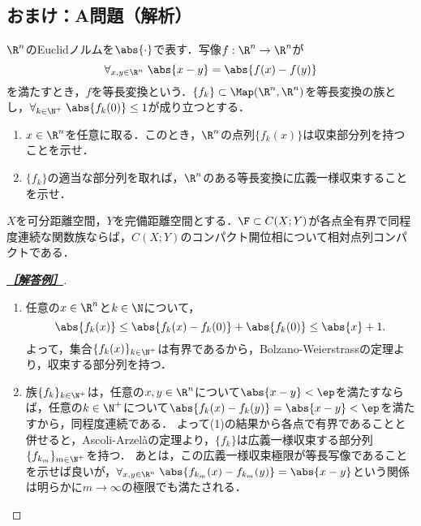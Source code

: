\documentclass[uplatex,dvipdfmx]{jsarticle}
\begin{document}
\subsection{おまけ：A問題（解析）}

\begin{tcolorbox}[colframe=ForestGreen, colback=ForestGreen!10!white,breakable,colbacktitle=ForestGreen!40!white,coltitle=black,fonttitle=\bfseries\sffamily,
    title=A 第4問]
    $\R^n$のEuclidノルムを$\abs{\cdot}$で表す．写像$f:\R^n\to\R^n$が
    \[\forall_{x,y\in\R^n}\;\abs{x-y}=\abs{f(x)-f(y)}\]
    を満たすとき，$f$を等長変換という．$\{f_k\}\subset\Map(\R^n,\R^n)$を等長変換の族とし，$\forall_{k\in\N^+}\;\abs{f_k(0)}\le1$が成り立つとする．
    \begin{enumerate}
        \item $x\in\R^n$を任意に取る．このとき，$\R^n$の点列$\{f_k(x)\}$は収束部分列を持つことを示せ．
        \item $\{f_k\}$の適当な部分列を取れば，$\R^n$のある等長変換に広義一様収束することを示せ．
    \end{enumerate}
\end{tcolorbox}
\begin{theorem}
    $X$を可分距離空間，$Y$を完備距離空間とする．$\F\subset C(X;Y)$が各点全有界で同程度連続な関数族ならば，$C(X;Y)$のコンパクト開位相について相対点列コンパクトである．
\end{theorem}
\begin{proof}[\textbf{\underline{［解答例］}}]\mbox{}
    \begin{enumerate}
        \item 任意の$x\in\R^n$と$k\in\N$について，
        \[\abs{f_k(x)}\le\abs{f_k(x)-f_k(0)}+\abs{f_k(0)}\le\abs{x}+1.\]
        よって，集合$\{f_k(x)\}_{k\in\N^+}$は有界であるから，Bolzano-Weierstrassの定理より，収束する部分列を持つ．
        \item 族$\{f_k\}_{k\in\N^+}$は，任意の$x,y\in\R^n$について$\abs{x-y}<\ep$を満たすならば，任意の$k\in\N^+$について$\abs{f_k(x)-f_k(y)}=\abs{x-y}<\ep$を満たすから，同程度連続である．
        よって(1)の結果から各点で有界であることと併せると，Ascoli-Arzelàの定理より，$\{f_{k}\}$は広義一様収束する部分列$\{f_{k_m}\}_{m\in\N^+}$を持つ．
        あとは，この広義一様収束極限が等長写像であることを示せば良いが，$\forall_{x,y\in\R^n}\;\abs{f_{k_m}(x)-f_{k_m}(y)}=\abs{x-y}$という関係は明らかに$m\to\infty$の極限でも満たされる．
    \end{enumerate}
\end{proof}
\end{document}
